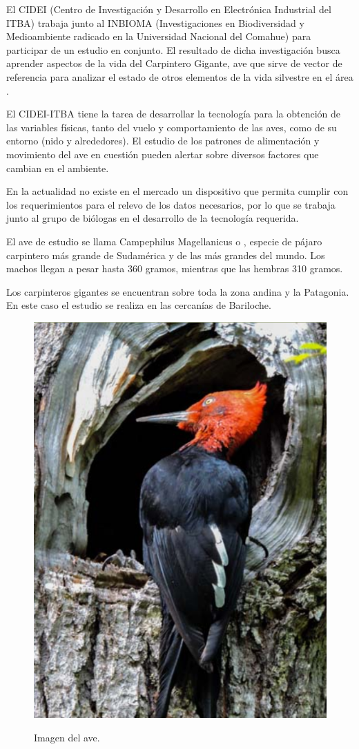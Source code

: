 El CIDEI (Centro de Investigación y Desarrollo en Electrónica Industrial del ITBA) trabaja junto al INBIOMA (Investigaciones en Biodiversidad y Medioambiente radicado en la Universidad Nacional del Comahue) para participar de un estudio en conjunto. El resultado de dicha investigación busca aprender aspectos de la vida del Carpintero Gigante, ave que sirve de vector de referencia para analizar el estado de otros elementos de la vida silvestre en el área \cite{ref:PaperValeriaOjeda}.

El CIDEI-ITBA tiene la tarea de desarrollar la tecnología para la obtención de las variables físicas, tanto del vuelo y comportamiento de las aves, como de su entorno (nido y alrededores). El estudio de los patrones de alimentación y movimiento del ave en cuestión pueden alertar sobre diversos factores que cambian en el ambiente.

En la actualidad no existe en el mercado un dispositivo que permita cumplir con los requerimientos para el relevo de los datos necesarios, por lo que se trabaja junto al grupo de biólogas en el desarrollo de la tecnología requerida.

El ave de estudio se llama Campephilus Magellanicus o , especie de pájaro carpintero más grande de Sudamérica y de las más grandes del mundo. Los machos llegan a pesar hasta 360 gramos, mientras que las hembras 310 gramos.

Los carpinteros gigantes se encuentran sobre toda la zona andina y la Patagonia. En este caso el estudio se realiza en las cercanías de Bariloche. 
\begin{figure}[H]
	\centering
	\includegraphics[width=0.4\linewidth]{ImagenesIntroduccion/pajaro}
	\label{fig:pajaro}
	\caption{Imagen del ave.}
\end{figure}

